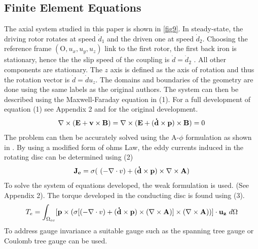 \documentclass[lettersize,journal]{IEEEtran}
\begin{document}
\subsection{Finite Element Equations}
The axial system studied in this paper is shown in \ref{fig9}. In steady-state, the driving rotor rotates at speed $\dot{d}_1$ and the driven one at speed $\dot{d}_2$. Choosing the reference frame $(\mathrm{O},u_x,u_y,u_z)$ link to the first rotor, the first back iron is stationary, hence the the slip speed of the coupling is $\dot{d}  = \dot{d}_2 $ . All other components are stationary. The $z$ axis is defined as the axis of rotation and thus the rotation vector is $\dot{d} = \dot{d}u_z$. The domains and boundaries of the geometry are done using the same labels as the original authors\cite{fontchastagner_2017_axialfield}. The system can then be described using the Maxwell-Faraday equation in (1). For a full development of equation (1) see Appendix 2 and \cite{fontchastagner_2017_axialfield} for the original development.
\begin{equation}
\nabla \times (\bold{E} + \bold{v} \times \bold{B}) = \nabla \times (\bold{E} + (\bold{\dot{d}} \times \bold{p}) \times \bold{B} ) = 0
\end{equation}
The problem can then be accurately solved using the A-$\phi$ formulation as shown in \cite{fontchastagner_2017_axialfield}. By using a modified form of ohms Law, the eddy currents induced in the rotating disc can be determined using (2)
\begin{equation}
\bold{J_e} = \sigma(\ (-\nabla\cdot v) + (\bold{\dot{d}} \times \bold{p} )\times \nabla \times \bold{A})
\end{equation}
To solve the system of equations developed, the weak formulation is used. (See Appendix 2).
The torque developed in the conducting disc is found using (3).
\begin{equation}
T_e = \int_{\Omega_{cc}} [\bold{p} \times (\sigma [(-\nabla \cdot v) + (\bold{\dot{d}}\times \bold{p}) \times (\nabla \times \bold{A})]\times (\nabla \times \bold{A}) )]\cdot \bold{u_z}\ d\Omega
\end{equation}
To address gauge invariance a suitable gauge such as the spanning tree gauge or Coulomb tree gauge can be used\cite{Creuse2019-sz}.
\end{document}
